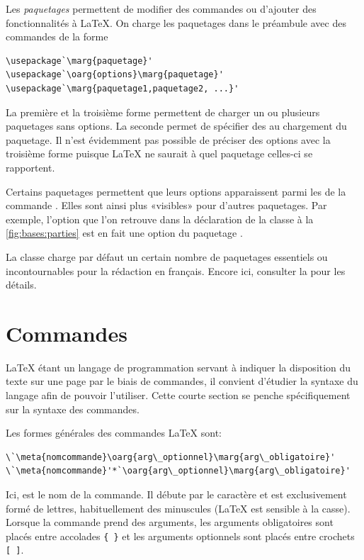 Les \emph{paquetages} permettent de modifier des commandes ou
d'ajouter des fonctionnalités à {\LaTeX}. On charge les paquetages
dans le préambule avec des commandes de la forme
\begin{lstlisting}
\usepackage`\marg{paquetage}'
\usepackage`\oarg{options}\marg{paquetage}'
\usepackage`\marg{paquetage1,paquetage2, ...}'
\end{lstlisting}
La première et la troisième forme permettent de charger un ou
plusieurs paquetages sans options. La seconde permet de spécifier des
 au chargement du paquetage. Il n'est évidemment pas
possible de préciser des options avec la troisième forme puisque
{\LaTeX} ne saurait à quel paquetage celles-ci se rapportent.

Certains paquetages permettent que leurs options apparaissent parmi
les  de la commande \cmdprint{\documentclass}. Elles
sont ainsi plus «visibles» pour d'autres paquetages. Par exemple,
l'option  que l'on retrouve dans la déclaration de la
classe à la \autoref{fig:bases:parties} est en fait une option du
paquetage .

La classe  charge par défaut un certain nombre de
paquetages essentiels ou incontournables pour la rédaction en
français. Encore ici, consulter la %
pour les détails.


\section{Commandes}
\label{chap:bases:commandes}

{\LaTeX} étant un langage de programmation servant à indiquer la
disposition du texte sur une page par le biais de commandes, il
convient d'étudier la syntaxe du langage afin de pouvoir l'utiliser.
Cette courte section se penche spécifiquement sur la syntaxe des
commandes.

Les formes générales des commandes {\LaTeX} sont:
\begin{lstlisting}
\`\meta{nomcommande}\oarg{arg\_optionnel}\marg{arg\_obligatoire}'
\`\meta{nomcommande}'*`\oarg{arg\_optionnel}\marg{arg\_obligatoire}'
\end{lstlisting}
Ici,  est le nom de la commande. Il débute par le
caractère {\bs} et est exclusivement formé de lettres, habituellement
des minuscules ({\LaTeX} est sensible à la casse). Lorsque la commande
prend des arguments, les arguments obligatoires sont placés entre
accolades \verb={ }= et les arguments optionnels sont placés entre
crochets \verb=[ ]=.

